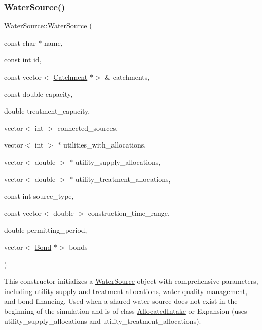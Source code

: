 \subsubsection{\texorpdfstring{Water\+Source()}{WaterSource()}\hspace{0.1cm}{\footnotesize\ttfamily [7/8]}}
{\footnotesize\ttfamily Water\+Source\+::\+Water\+Source (\begin{DoxyParamCaption}\item[{const char $\ast$}]{name,  }\item[{const int}]{id,  }\item[{const vector$<$ \mbox{\hyperlink{classCatchment}{Catchment}} $\ast$$>$ \&}]{catchments,  }\item[{const double}]{capacity,  }\item[{double}]{treatment\+\_\+capacity,  }\item[{vector$<$ int $>$}]{connected\+\_\+sources,  }\item[{vector$<$ int $>$ $\ast$}]{utilities\+\_\+with\+\_\+allocations,  }\item[{vector$<$ double $>$ $\ast$}]{utility\+\_\+supply\+\_\+allocations,  }\item[{vector$<$ double $>$ $\ast$}]{utility\+\_\+treatment\+\_\+allocations,  }\item[{const int}]{source\+\_\+type,  }\item[{const vector$<$ double $>$}]{construction\+\_\+time\+\_\+range,  }\item[{double}]{permitting\+\_\+period,  }\item[{vector$<$ \mbox{\hyperlink{classBond}{Bond}} $\ast$$>$}]{bonds }\end{DoxyParamCaption})}



This constructor initializes a {\ttfamily \mbox{\hyperlink{classWaterSource}{Water\+Source}}} object with comprehensive parameters, including utility supply and treatment allocations, water quality management, and bond financing. Used when a shared water source does not exist in the beginning of the simulation and is of class {\ttfamily \mbox{\hyperlink{classAllocatedIntake}{Allocated\+Intake}}} or {\ttfamily Expansion} (uses {\ttfamily utility\+\_\+supply\+\_\+allocations} and {\ttfamily utility\+\_\+treatment\+\_\+allocations}). 


